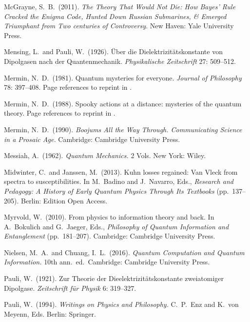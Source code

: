 \documentclass[12pt]{article}
\numberwithin{equation}{section}
\begin{document}
\begin{thebibliography}{}
  McGrayne, S.\ B.\ (2011). \emph{The Theory That Would Not Die: How Bayes' Rule Cracked the Enigma Code, Hunted Down Russian Submarines, \& Emerged Triumphant from Two centuries of Controversy}. New Haven: Yale University Press. 

 Mensing, L.\ and Pauli, W.\ (1926). \"Uber die Dielektrizit\"atskonstante von Dipolgasen nach der Quantenmechanik. \emph{Physikalische Zeitschrift} 27: 509--512.

 Mermin, N.\ D.\ (1981). Quantum mysteries for everyone. \emph{Journal of Philosophy} 78: 397--408. Page references to reprint in \citet[pp.\ 81--94]{Mermin 1990}.

 Mermin, N.\ D.\ (1988). Spooky actions at a distance: mysteries of the quantum theory.  Page references to reprint in \citet[pp.\ 110--176]{Mermin 1990}.

 Mermin, N.\ D.\ (1990). \emph{Boojums All the Way Through. Communicating Science in a Prosaic Age.} Cambridge: Cambridge University Press.

 Messiah, A.\ (1962). \emph{Quantum Mechanics.} 2 Vols. New York: Wiley. 

 Midwinter, C.\ and Janssen, M.\ (2013). Kuhn losses regained: Van Vleck from spectra to susceptibilities. In M.\ Badino and J.\ Navarro, Eds., \emph{Research and Pedagogy: A History of Early Quantum Physics Through Its Textbooks} (pp.\ 137--205). Berlin: Edition Open Access.

 Myrvold, W.\ (2010). From physics to information theory and back. In A.\ Bokulich and G.\ Jaeger, Eds., \emph{Philosophy of Quantum Information and Entanglement} (pp.\ 181--207). Cambridge: Cambridge University Press.

 Nielsen, M.\ A.\ and Chuang, I.\ L.\ (2016). \emph{Quantum Computation and Quantum Information.} 10th ann.\ ed.\ Cambridge: Cambridge University Press.

 Pauli, W.\ (1921). Zur Theorie der Dieelektrizit\"atskonstante zweiatomiger Dipolgase. \emph{Zeitschrift f\"ur Physik} 6: 319--327.

 Pauli, W.\ (1994). \emph{Writings on Physics and Philosophy.} C.\ P.\ Enz and K.\ von Meyenn, Eds. Berlin: Springer.


\end{thebibliography}
\end{document}
